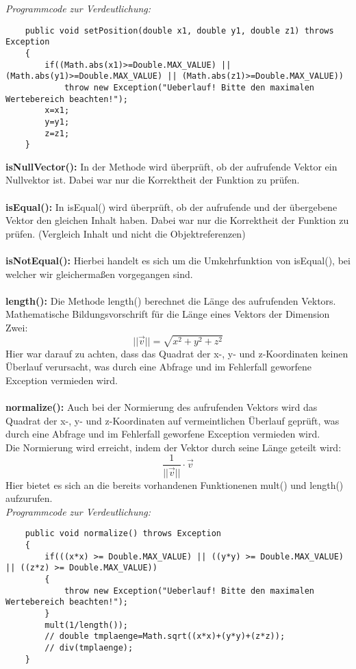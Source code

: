 \documentclass[a4paper,11pt]{scrartcl}
\begin{document}
\textit{Programmcode zur Verdeutlichung:}
\begin{lstlisting}
	public void setPosition(double x1, double y1, double z1) throws Exception
	{
		if((Math.abs(x1)>=Double.MAX_VALUE) || (Math.abs(y1)>=Double.MAX_VALUE) || (Math.abs(z1)>=Double.MAX_VALUE))
			throw new Exception("Ueberlauf! Bitte den maximalen Wertebereich beachten!");
		x=x1;
		y=y1;
		z=z1;
	}
\end{lstlisting} $\;$ \\
\textbf{isNullVector(): } In der Methode wird überprüft, ob der aufrufende Vektor ein Nullvektor ist. Dabei war nur die Korrektheit der Funktion zu prüfen.\\
\\
\textbf{isEqual(): } In isEqual() wird überprüft, ob der aufrufende und der übergebene Vektor den gleichen Inhalt haben. Dabei war nur die Korrektheit der Funktion zu prüfen. (Vergleich Inhalt und nicht die Objektreferenzen)\\
\\
\textbf{isNotEqual(): } Hierbei handelt es sich um die Umkehrfunktion von isEqual(), bei welcher wir gleichermaßen vorgegangen sind.\\
\\
\textbf{length(): } Die Methode length() berechnet die Länge des aufrufenden Vektors.\\
Mathematische Bildungsvorschrift für die Länge eines Vektors der Dimension Zwei:
\[ ||\vec v|| = \sqrt{x^2 + y^2 + z^2} \]
Hier war darauf zu achten, dass das Quadrat der x-, y- und z-Koordinaten keinen Überlauf verursacht, was durch eine Abfrage und im Fehlerfall geworfene Exception vermieden wird.\\
\\
\textbf{normalize(): } Auch bei der Normierung des aufrufenden Vektors wird das Quadrat der x-, y- und z-Koordinaten auf vermeintlichen Überlauf geprüft, was durch eine Abfrage und im Fehlerfall geworfene Exception vermieden wird.\\
Die Normierung wird erreicht, indem der Vektor durch seine Länge geteilt wird:
\[ \frac{1}{||\vec v||} \cdot \vec v \]
Hier bietet es sich an die bereits vorhandenen Funktionenen mult() und length() aufzurufen.\\
\textit{Programmcode zur Verdeutlichung:}
\begin{lstlisting}
	public void normalize() throws Exception
	{
		if(((x*x) >= Double.MAX_VALUE) || ((y*y) >= Double.MAX_VALUE) || ((z*z) >= Double.MAX_VALUE))
		{
			throw new Exception("Ueberlauf! Bitte den maximalen Wertebereich beachten!");
		}
		mult(1/length());
		// double tmplaenge=Math.sqrt((x*x)+(y*y)+(z*z));		
		// div(tmplaenge);
	}
\end{lstlisting}
\end{document}

